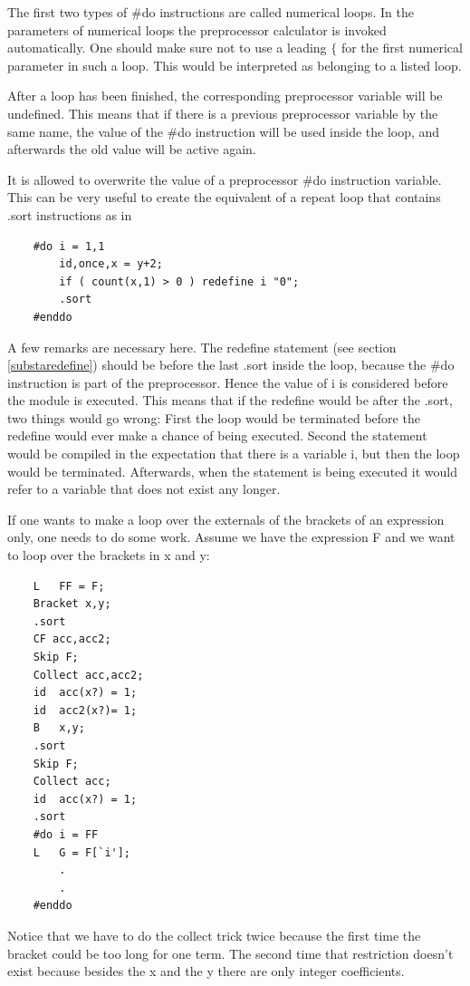 The first two types of \#do instructions are called 
numerical loops. In the 
parameters of numerical loops the preprocessor calculator 
is invoked automatically. One should make sure not to use a leading $\{$ 
for the first numerical parameter in such a loop. This would be interpreted 
as belonging to a listed loop.

After a loop has been finished, the corresponding preprocessor variable 
will be undefined. This means that if there is a previous preprocessor 
variable by the same name, the value of the \#do instruction will be used 
inside the loop, and afterwards the old value will be active again.

It is allowed to overwrite the value of a preprocessor \#do instruction 
variable. This can be very useful to create the equivalent of a repeat loop 
that contains .sort instructions as in
\begin{verbatim}
    #do i = 1,1
        id,once,x = y+2;
        if ( count(x,1) > 0 ) redefine i "0";
        .sort
    #enddo
\end{verbatim}
A few remarks are necessary here. The redefine statement 
(see section \ref{substaredefine}) should be before the last 
.sort inside the loop, because the \#do instruction is part of 
the preprocessor. Hence the value of i is considered before the module is 
executed. This means that if the redefine would be after the .sort, two 
things would go wrong: First the loop would be terminated before the 
redefine would ever make a chance of being executed. Second the statement 
would be compiled in the expectation that there is a variable i, but then 
the loop would be terminated. Afterwards, when the statement is being 
executed it would refer to a variable that does not exist any longer. 

If one wants to make a loop over the externals of the brackets of an 
expression only, one needs to do some work. Assume we have the expression F 
and we want to loop over the brackets in x and y:
\begin{verbatim}
    L   FF = F;
    Bracket x,y;
    .sort
    CF acc,acc2;
    Skip F;
    Collect acc,acc2;
    id  acc(x?) = 1;
    id  acc2(x?)= 1;
    B   x,y;
    .sort
    Skip F;
    Collect acc;
    id  acc(x?) = 1;
    .sort
    #do i = FF
    L   G = F[`i'];
        .
        .
    #enddo
\end{verbatim}
Notice that we have to do the collect trick twice because 
the first time the bracket could be too long for one term. The second time 
that restriction doesn't exist because besides the x and the y there are 
only integer coefficients.

